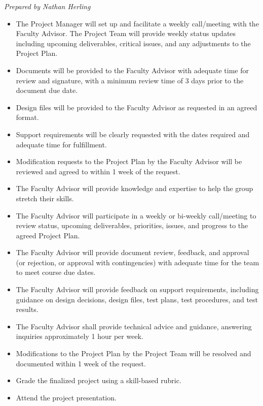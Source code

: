 \documentclass[11pt]{article}
\newcommand{\preparedby}{%
  \par\nobreak\vspace{-6pt}%
  {\footnotesize\itshape\color{forgemute}Prepared by Nathan Herling}%
  \par\vspace{4pt}}
\begin{document}
\preparedby


\begin{itemize}[leftmargin=1.4em]
  \item The Project Manager will set up and facilitate a weekly call/meeting with the Faculty Advisor. The Project Team will provide weekly status updates including upcoming deliverables, critical issues, and any adjustments to the Project Plan.
  \item Documents will be provided to the Faculty Advisor with adequate time for review and signature, with a minimum review time of 3 days prior to the document due date.
  \item Design files will be provided to the Faculty Advisor as requested in an agreed format.
  \item Support requirements will be clearly requested with the dates required and adequate time for fulfillment.
  \item Modification requests to the Project Plan by the Faculty Advisor will be reviewed and agreed to within 1 week of the request.
\end{itemize}

\begin{itemize}[leftmargin=1.4em]
  \item The Faculty Advisor will provide knowledge and expertise to help the group stretch their skills.
  \item The Faculty Advisor will participate in a weekly or bi-weekly call/meeting to review status, upcoming deliverables, priorities, issues, and progress to the agreed Project Plan.
  \item The Faculty Advisor will provide document review, feedback, and approval (or rejection, or approval with contingencies) with adequate time for the team to meet course due dates.
  \item The Faculty Advisor will provide feedback on support requirements, including guidance on design decisions, design files, test plans, test procedures, and test results.
  \item The Faculty Advisor shall provide technical advice and guidance, answering inquiries approximately 1 hour per week.
  \item Modifications to the Project Plan by the Project Team will be resolved and documented within 1 week of the request.
  \item Grade the finalized project using a skill-based rubric.
  \item Attend the project presentation.
\end{itemize}
\end{document}

